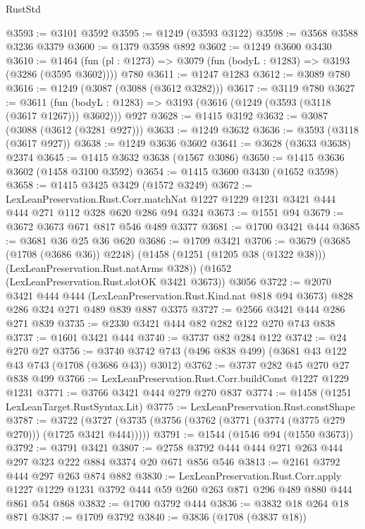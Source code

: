 \begin{lexlean}{RustStd}
\begin{coremodule}
@3593 := @3101 @3592
@3595 := @1249 (@3593 @3122)
@3598 := @3568 @3588 @3236 @3379
@3600 := @1379 @3598 @892
@3602 := @1249 @3600 @3430
@3610 := @1464 (fun (pl : @1273) => @3079 (fun (bodyL : @1283) => @3193 (@3286 (@3595 @3602)))) @780
@3611 := @1247 @1283
@3612 := @3089 @780
@3616 := @1249 (@3087 (@3088 (@3612 @3282)))
@3617 := @3119 @780
@3627 := @3611
    (fun (bodyL : @1283) => @3193 (@3616 (@1249 (@3593 (@3118 (@3617 @1267))) @3602)))
    @927
@3628 := @1415 @3192
@3632 := @3087 (@3088 (@3612 (@3281 @927)))
@3633 := @1249 @3632
@3636 := @3593 (@3118 (@3617 @927))
@3638 := @1249 @3636 @3602
@3641 := @3628 (@3633 @3638) @2374
@3645 := @1415 @3632 @3638 (@1567 @3086)
@3650 := @1415 @3636 @3602 (@1458 @3100 @3592)
@3654 := @1415 @3600 @3430 (@1652 @3598)
@3658 := @1415 @3425 @3429 (@1572 @3249)
@3672 := LexLeanPreservation.Rust.Corr.matchNat
    @1227
    @1229
    @1231
    @3421
    @444
    @444
    @271
    @112
    @328
    @620
    @286
    @94
    @324
@3673 := @1551 @94
@3679 := @3672 @3673 @671 @817 @546 @489 @3377
@3681 := @1700 @3421 @444
@3685 := @3681 @36 @25 @36 @620
@3686 := @1709 @3421
@3706 := @3679
    (@3685 (@1708 (@3686 @36)) @2248)
    (@1458 (@1251 (@1205 @38 (@1322 @38))) (LexLeanPreservation.Rust.natArms @328))
    (@1652 (LexLeanPreservation.Rust.slotOK @3421 @3673))
    @3056
@3722 := @2070
    @3421
    @444
    @444
    (LexLeanPreservation.Rust.Kind.nat @818 @94 @3673)
    @828
    @286
    @324
    @271
    @489
    @839
    @887
    @3375
@3727 := @2566 @3421 @444 @286 @271 @839
@3735 := @2330 @3421 @444 @82 @282 @122 @270 @743 @838
@3737 := @1601 @3421 @444
@3740 := @3737 @82 @284 @122
@3742 := @24 @270 @27
@3756 := @3740 @3742 @743 (@496 @838 @499) (@3681 @43 @122 @43 @743 (@1708 (@3686 @43)) @3012)
@3762 := @3737 @282 @45 @270 @27 @838 @499
@3766 := LexLeanPreservation.Rust.Corr.buildConst @1227 @1229 @1231
@3771 := @3766 @3421 @444 @279 @270 @837
@3774 := @1458 (@1251 LexLeanTarget.RustSyntax.Lit)
@3775 := LexLeanPreservation.Rust.constShape
@3787 := @3722 (@3727 (@3735 (@3756 (@3762 (@3771 (@3774 (@3775 @279 @270))) (@1725 @3421 @444)))))
@3791 := @1544 (@1546 @94 (@1550 @3673))
@3792 := @3791 @3421
@3807 := @2758 @3792 @444 @444 @271 @263 @444 @297 @323 @222 @884 @3374 @20 @671 @856 @546
@3813 := @2161 @3792 @444 @297 @263 @874 @882
@3830 := LexLeanPreservation.Rust.Corr.apply
    @1227
    @1229
    @1231
    @3792
    @444
    @59
    @260
    @263
    @871
    @296
    @489
    @880
    @444
    @861
    @54
    @868
@3832 := @1700 @3792 @444
@3836 := @3832 @18 @264 @18 @871
@3837 := @1709 @3792
@3840 := @3836 (@1708 (@3837 @18))

\end{coremodule}
\end{lexlean}
